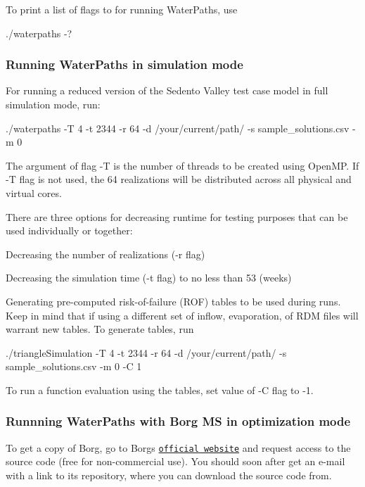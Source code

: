To print a list of flags to for running Water\+Paths, use 
\begin{DoxyCode}
./waterpaths -?
\end{DoxyCode}


\subsubsection*{Running Water\+Paths in simulation mode}

For running a reduced version of the Sedento Valley test case model in full simulation mode, run\+: 
\begin{DoxyCode}
./waterpaths -T 4 -t 2344 -r 64 -d /your/current/path/ -s sample\_solutions.csv -m 0 
\end{DoxyCode}
 The argument of flag -\/T is the number of threads to be created using Open\+MP. If -\/T flag is not used, the 64 realizations will be distributed across all physical and virtual cores.

There are three options for decreasing runtime for testing purposes that can be used individually or together\+:
\begin{DoxyItemize}
\item Decreasing the number of realizations (-\/r flag)
\item Decreasing the simulation time (-\/t flag) to no less than 53 (weeks)
\item Generating pre-\/computed risk-\/of-\/failure (R\+OF) tables to be used during runs. Keep in mind that if using a different set of inflow, evaporation, of R\+DM files will warrant new tables. To generate tables, run 
\begin{DoxyCode}
./triangleSimulation -T 4 -t 2344 -r 64 -d /your/current/path/ -s sample\_solutions.csv -m 0 -C 1
\end{DoxyCode}
 To run a function evaluation using the tables, set value of -\/C flag to -\/1.
\end{DoxyItemize}

\subsubsection*{Runnning Water\+Paths with Borg MS in optimization mode}

To get a copy of Borg, go to Borg\textquotesingle{}s \href{http://borgmoea.org/}{\tt official website} and request access to the source code (free for non-\/commercial use). You should soon after get an e-\/mail with a link to its repository, where you can download the source code from.

